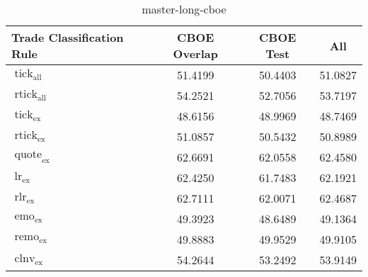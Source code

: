 \begin{table}
    \centering
    \caption[master-short]{master-long-cboe}
    \label{tab:cboe_supervised_all-master-cboe}
    \begin{tabular}{lSSS}
        \toprule
        {Trade Classification Rule}                                                                                          & {\gls{CBOE} Overlap} & {\gls{CBOE} Test} & {All}   \\\midrule
        $\operatorname{tick}_{\mathrm{all}}$                                                                                  & 51.4199              & 50.4403           & 51.0827 \\
        $\operatorname{rtick}_{\mathrm{all}}$                                                                                 & 54.2521              & 52.7056           & 53.7197 \\ \midrule
        $\operatorname{tick}_{\mathrm{ex}}$                                                                                   & 48.6156              & 48.9969           & 48.7469 \\
        $\operatorname{rtick}_{\mathrm{ex}}$                                                                                  & 51.0857              & 50.5432           & 50.8989 \\
        $\operatorname{quote}_{\mathrm{ex}}$                                                                                  & 62.6691              & 62.0558           & 62.4580 \\
        $\operatorname{lr}_{\mathrm{ex}}$                                                                                     & 62.4250              & 61.7483           & 62.1921 \\
        $\operatorname{rlr}_{\mathrm{ex}}$                                                                                    & 62.7111              & 62.0071           & 62.4687 \\
        $\operatorname{emo}_{\mathrm{ex}}$                                                                                    & 49.3923              & 48.6489           & 49.1364 \\
        $\operatorname{remo}_{\mathrm{ex}}$                                                                                   & 49.8883              & 49.9529           & 49.9105 \\
        $\operatorname{clnv}_{\mathrm{ex}}$                                                                                   & 54.2644              & 53.2492           & 53.9149 \\

\end{tabular}
\end{table}
